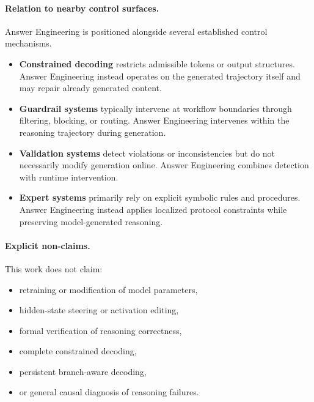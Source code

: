 \documentclass[twocolumn]{article}
\begin{document}
\paragraph{Relation to nearby control surfaces.}

Answer Engineering is positioned alongside several established control
mechanisms.

\begin{itemize}[leftmargin=*]

\item
\textbf{Constrained decoding} restricts admissible tokens or output structures.
Answer Engineering instead operates on the generated trajectory itself and may
repair already generated content.

\item
\textbf{Guardrail systems} typically intervene at workflow boundaries through
filtering, blocking, or routing. Answer Engineering intervenes within the
reasoning trajectory during generation.

\item
\textbf{Validation systems} detect violations or inconsistencies but do not
necessarily modify generation online. Answer Engineering combines detection with
runtime intervention.

\item
\textbf{Expert systems} primarily rely on explicit symbolic rules and
procedures. Answer Engineering instead applies localized protocol constraints
while preserving model-generated reasoning.

\end{itemize}

\paragraph{Explicit non-claims.}

This work does not claim:

\begin{itemize}[leftmargin=*]

\item retraining or modification of model parameters,

\item hidden-state steering or activation editing,

\item formal verification of reasoning correctness,

\item complete constrained decoding,

\item persistent branch-aware decoding,

\item or general causal diagnosis of reasoning failures.

\end{itemize}
\end{document}
